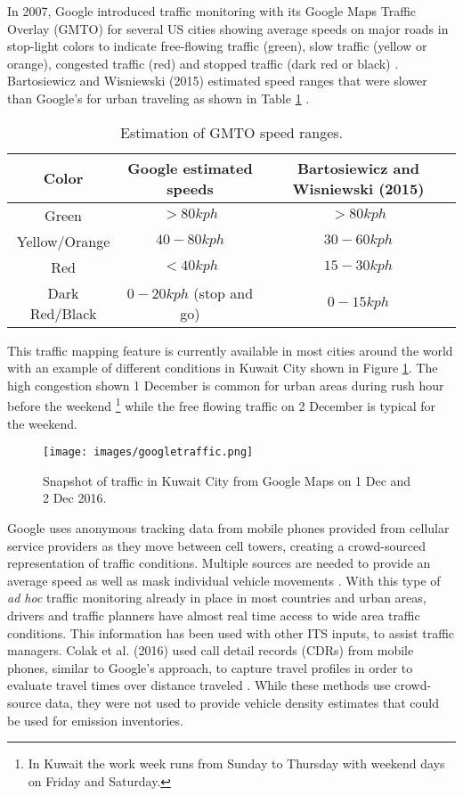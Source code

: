 In 2007, Google introduced traffic monitoring with its Google Maps Traffic Overlay (GMTO) for several US cities showing average speeds on major roads in stop-light colors to indicate free-flowing traffic (green), slow traffic (yellow or orange), congested traffic (red) and stopped traffic (dark red or black) \cite{Google2007}. Bartosiewicz and Wisniewski (2015) estimated speed ranges that were slower than Google's for urban traveling as shown in Table \ref{tb:speedcolor} \citep{Bartosiewicz2015}.
%
\begin{table}
\centering
\caption{Estimation of GMTO speed ranges.}
\label{tb:speedcolor}
\begin{tabular}{@{}ccc@{}}
\toprule
\textbf{Color} & \textbf{Google estimated speeds} & \textbf{Bartosiewicz and Wisniewski (2015)} \\ \midrule
Green & $>80 kph$ & $> 80 kph$ \\
Yellow/Orange & $40 - 80 kph$ & $30 - 60 kph$ \\
Red & $<40 kph$ & $15 - 30 kph$ \\
Dark Red/Black & $0 - 20 kph$ (stop and go) & $0 - 15 kph$ \\ \bottomrule
\end{tabular}
\end{table}
%
This traffic mapping feature is currently available in most cities around the world with an example of different conditions in Kuwait City shown in Figure \ref{fig:GoogleTraffic}. The high congestion shown 1 December is common for urban areas during rush hour before the weekend \footnote{In Kuwait the work week runs from Sunday to Thursday with weekend days on Friday and Saturday.} while the free flowing traffic on 2 December is typical for the weekend.
%
\begin{figure}[!htbp]
\centering
\texttt{[image: images/googletraffic.png]}  
\caption[Snapshot of traffic in Google Maps]{Snapshot of traffic in Kuwait City from Google Maps on 1 Dec and 2 Dec 2016.}
\label{fig:GoogleTraffic}
\end{figure}
%
Google uses anonymous tracking data from mobile phones provided from cellular service providers as they move between cell towers, creating a crowd-sourced representation of traffic conditions. Multiple sources are needed to provide an average speed as well as mask individual vehicle movements \cite{Barth2009a}.  With this type of \textit{ad hoc} traffic monitoring already in place in most countries and urban areas, drivers and traffic planners have almost real time access to wide area traffic conditions. This information has been used with other ITS inputs, to assist traffic managers\citep{Wu2007}. Colak et al. (2016) used call detail records (CDRs) from mobile phones, similar to Google's approach, to capture travel profiles in order to evaluate travel times over distance traveled \citep{Colak2016}.  While these methods use crowd-source data, they were not used to provide vehicle density estimates that could be used for emission inventories.\\

